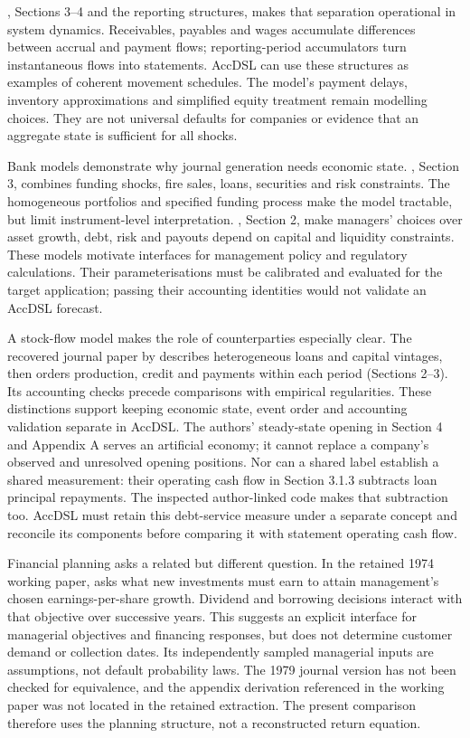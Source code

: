 \citet{pierson2020}, Sections 3--4 and the reporting structures, makes that
separation operational in system dynamics. Receivables, payables and wages
accumulate differences between accrual and payment flows; reporting-period
accumulators turn instantaneous flows into statements. AccDSL can use these
structures as examples of coherent movement schedules. The model's payment
delays, inventory approximations and simplified equity treatment remain
modelling choices. They are not universal defaults for companies or evidence
that an aggregate state is sufficient for all shocks.

Bank models demonstrate why journal generation needs economic state.
\citet{halaj2016}, Section 3, combines funding shocks, fire sales, loans,
securities and risk constraints. The homogeneous portfolios and specified
funding process make the model tractable, but limit instrument-level
interpretation. \citet{behn2019}, Section 2, make managers' choices over asset
growth, debt, risk and payouts depend on capital and liquidity constraints.
These models motivate interfaces for management policy and regulatory
calculations. Their parameterisations must be calibrated and evaluated for
the target application; passing their accounting identities would not validate
an AccDSL forecast.

A stock-flow model makes the role of counterparties especially clear. The
recovered journal paper by \citet{caiani2016} describes heterogeneous loans and
capital vintages, then orders production, credit and payments within each
period (Sections 2--3). Its accounting checks precede comparisons with
empirical regularities. These distinctions support keeping economic state,
event order and accounting validation separate in AccDSL. The authors'
steady-state opening in Section 4 and Appendix A serves an artificial economy;
it cannot replace a company's observed and unresolved opening positions.
Nor can a shared label establish a shared measurement: their operating cash
flow in Section 3.1.3 subtracts loan principal repayments. The inspected
author-linked code makes that subtraction too. AccDSL must retain this
debt-service measure under a separate concept and reconcile its components
before comparing it with statement operating cash flow.

Financial planning asks a related but different question. In the retained
1974 working paper, \citet{gentry1974wp} asks what new investments must earn
to attain management's chosen earnings-per-share growth. Dividend and borrowing
decisions interact with that objective over successive years. This suggests
an explicit interface for managerial objectives and financing responses, but
does not determine customer demand or collection dates. Its independently
sampled managerial inputs are assumptions, not default probability laws. The
1979 journal version has not been checked for equivalence, and the appendix
derivation referenced in the working paper was not located in the retained
extraction. The present comparison therefore uses the planning structure,
not a reconstructed return equation.

